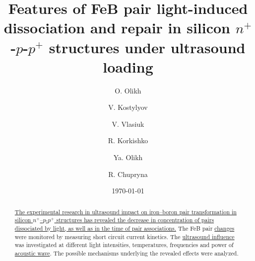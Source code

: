 \documentclass[%
 aip,jap,
 amsmath,amssymb,
 reprint,%
]{revtex4-1}
\begin{document}

\title[FeB transformations under ultrasound loading]{Features of FeB pair light-induced dissociation and repair in silicon $n^+$-$p$-$p^+$ structures under ultrasound loading}
\author{O. Olikh}
\author{V. Kostylyov}%
\author{V. Vlasiuk}
\author{R. Korkishko}
\author{Ya. Olikh}
%

\author{R. Chupryna}


\date{\today}%


\begin{abstract}
\textcolor[rgb]{0.00,0.07,1.00}{\uline{
The experimental research in ultrasound impact on iron--boron pair transformation in
silicon $n^+$–$p$-$p^+$ structures has revealed the decrease in concentration of pairs dissociated by light, as well as in the time of pair associations.}}
The FeB pair  \textcolor[rgb]{0.00,0.07,1.00}{\uline{changes}} were monitored by measuring short circuit current kinetics.
The \textcolor[rgb]{0.00,0.07,1.00}{\uline{ultrasound influence}} was investigated at different light intensities, temperatures,
frequencies and power of \textcolor[rgb]{0.00,0.07,1.00}{\uline{acoustic wave}}.
The possible mechanisms underlying the revealed  effects were analyzed.
\end{abstract}
\end{document}
